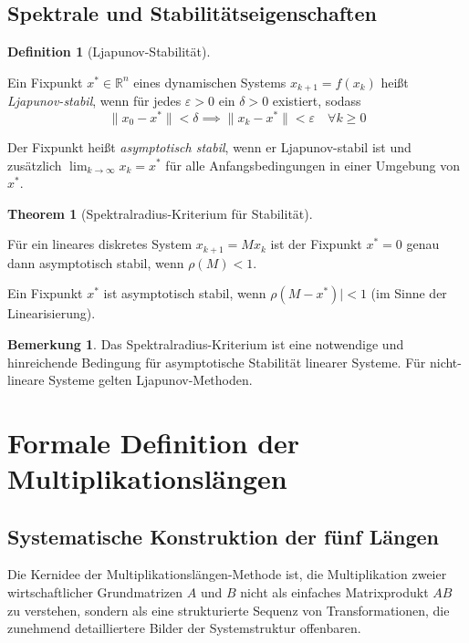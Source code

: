\documentclass[a4paper,12pt]{article}
\theoremstyle{definition}
\newtheorem{definition}{Definition}
\newtheorem{bemerkung}{Bemerkung}
\newtheorem{theorem}{Theorem}
\begin{document}
\subsection{Spektrale und Stabilitätseigenschaften}

\begin{definition}[Ljapunov-Stabilität]
\label{def:ljapunov}

Ein Fixpunkt $x^* \in \mathbb{R}^n$ eines dynamischen Systems $x_{k+1} = f(x_k)$ heißt \emph{Ljapunov-stabil}, wenn für jedes $\varepsilon > 0$ ein $\delta > 0$ existiert, sodass
\[
\|x_0 - x^*\| < \delta \implies \|x_k - x^*\| < \varepsilon \quad \forall k \geq 0
\]

Der Fixpunkt heißt \emph{asymptotisch stabil}, wenn er Ljapunov-stabil ist und zusätzlich $\lim_{k \to \infty} x_k = x^*$ für alle Anfangsbedingungen in einer Umgebung von $x^*$.
\end{definition}

\begin{theorem}[Spektralradius-Kriterium für Stabilität]
\label{thm:spektralradius}

Für ein lineares diskretes System $x_{k+1} = M x_k$ ist der Fixpunkt $x^* = 0$ genau dann asymptotisch stabil, wenn $\rho(M) < 1$.

Ein Fixpunkt $x^*$ ist asymptotisch stabil, wenn $\rho(M - x^*)| < 1$ (im Sinne der Linearisierung).
\end{theorem}

\begin{bemerkung}
Das Spektralradius-Kriterium ist eine notwendige und hinreichende Bedingung für asymptotische Stabilität linearer Systeme. Für nicht-lineare Systeme gelten Ljapunov-Methoden.
\end{bemerkung}

\section{Formale Definition der Multiplikationslängen}

\subsection{Systematische Konstruktion der fünf Längen}

Die Kernidee der Multiplikationslängen-Methode ist, die Multiplikation zweier wirtschaftlicher Grundmatrizen $A$ und $B$ nicht als einfaches Matrixprodukt $AB$ zu verstehen, sondern als eine strukturierte Sequenz von Transformationen, die zunehmend detailliertere Bilder der Systemstruktur offenbaren.
\end{document}
